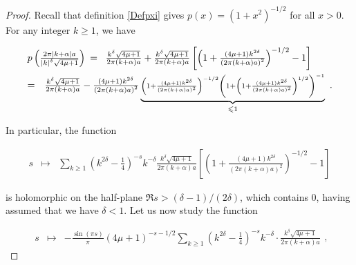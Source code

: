 \documentclass{jams-l}
\theoremstyle{definition}
\theoremstyle{remark}
\numberwithin{equation}{section}
\begin{document}
            \begin{proof}
            
                Recall that definition \ref{Defpxi} gives $p \left( x \right) = \left( 1+x^2 \right)^{-1/2}$ for all $x>0$. For any integer $k \geqslant 1$, we have
                
                \[ \begin{array}{llll}
                        \multicolumn{2}{l}{p \left( \frac{2 \pi \left \vert k + \alpha \right \vert a}{\left \vert k \right \vert^{\delta} \sqrt{4 \mu + 1}} \right)} = & \frac{k^{\delta} \sqrt{4 \mu + 1}}{2 \pi \left( k + \alpha \right) a} + \frac{k^{\delta} \sqrt{4 \mu + 1}}{2 \pi \left( k + \alpha \right) a} \left[ \left( 1 + \frac{\left( 4 \mu + 1 \right) k^{2 \delta}}{\left( 2 \pi \left( k + \alpha \right) a \right)^2} \right)^{-1/2} - 1 \right] \\[1em]
                        
                        = & \multicolumn{3}{l}{\frac{k^{\delta} \sqrt{4 \mu + 1}}{2 \pi \left( k + \alpha \right) a} - \frac{\left( 4 \mu + 1 \right) k^{2 \delta}}{\left( 2 \pi \left( k + \alpha \right) a \right)^2} \underbrace{\scriptstyle \left( 1 + \frac{\left( 4 \mu + 1 \right) k^{2 \delta}}{\left( 2 \pi \left( k + \alpha \right) a \right)^2} \right)^{-1/2} \left( 1 + \left( 1 + \frac{\left( 4 \mu + 1 \right) k^{2 \delta}}{\left( 2 \pi \left( k + \alpha \right) a \right)^2} \right)^{1/2} \right)^{-1}}_{\leqslant 1}}.
                    \end{array} \]
                
                \noindent In particular, the function
                
                \[ \begin{array}{lll}
                        s & \longmapsto & \sum\limits_{k \geqslant 1} \left( k^{2 \delta} - \frac{1}{4} \right)^{-s} k^{- \delta} \frac{k^{\delta} \sqrt{4 \mu + 1}}{2 \pi \left( k + \alpha \right) a} \left[ \left( 1 + \frac{\left( 4 \mu + 1 \right) k^{2 \delta}}{\left( 2 \pi \left( k + \alpha \right) a \right)^2} \right)^{-1/2} - 1 \right]
                    \end{array} \]
                
                \noindent is holomorphic on the half-plane $\Re s > \left( \delta - 1 \right) / \left( 2 \delta \right)$, which contains $0$, having assumed that we have $\delta < 1$. Let us now study the function
                
                \[ \begin{array}{lll}
                        s & \longmapsto & - \frac{\sin \left( \pi s \right)}{\pi} \left( 4 \mu + 1 \right)^{-s-1/2} \sum\limits_{k \geqslant 1} \left( k^{2 \delta} - \frac{1}{4} \right)^{-s} k^{-\delta} \cdot \frac{k^{\delta} \sqrt{4 \mu + 1}}{2 \pi \left( k + \alpha \right) a}
                    \end{array} , \]
                

\end{proof}
\end{document}
